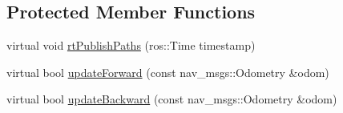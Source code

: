 \subsection*{Protected Member Functions}
\begin{DoxyCompactItemize}
\item 
virtual void \hyperlink{classsmacc__odom__tracker_1_1OdomTracker_a8c9144a9d8b9ede7f45d06492496564c}{rt\-Publish\-Paths} (ros\-::\-Time timestamp)
\item 
virtual bool \hyperlink{classsmacc__odom__tracker_1_1OdomTracker_a7ef4ecc171a6fd37b2ed3c96a58e0659}{update\-Forward} (const nav\-\_\-msgs\-::\-Odometry \&odom)
\item 
virtual bool \hyperlink{classsmacc__odom__tracker_1_1OdomTracker_a3a47119be9af27de9115b043d1f76fe7}{update\-Backward} (const nav\-\_\-msgs\-::\-Odometry \&odom)
\end{DoxyCompactItemize}
